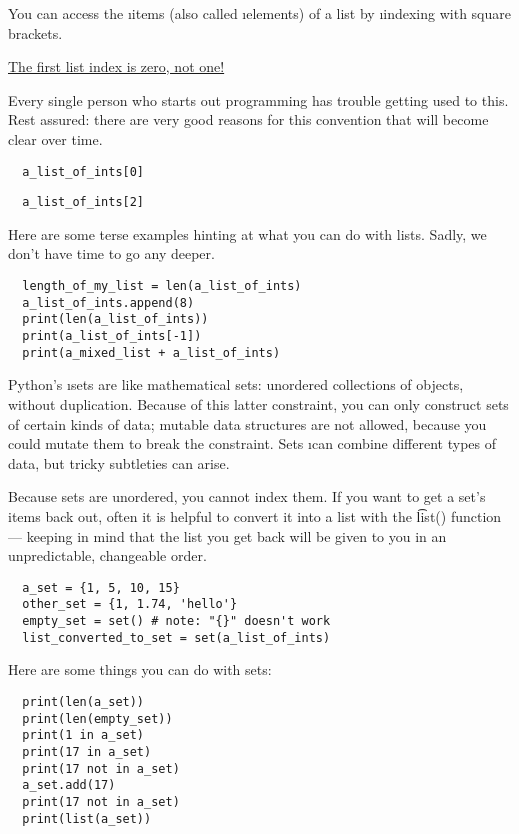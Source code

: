 \documentclass[letterpaper, 12pt, titlepage, twoside]{article}
\begin{document}
You can access the \i{items} (also called \i{elements}) of a list by
\i{indexing} with square brackets.

\medskip
\begin{center}
  \Large \underline{The first list index is zero, not one!}
\end{center}
\medskip

Every single person who starts out programming has trouble getting used to
this. Rest assured: there are very good reasons for this convention that will
become clear over time.

\begin{lstlisting}
  a_list_of_ints[0]
\end{lstlisting}

\begin{lstlisting}
  a_list_of_ints[2]
\end{lstlisting}

Here are some terse examples hinting at what you can do with lists. Sadly, we
don't have time to go any deeper.

\begin{lstlisting}
  length_of_my_list = len(a_list_of_ints)
  a_list_of_ints.append(8)
  print(len(a_list_of_ints))
  print(a_list_of_ints[-1])
  print(a_mixed_list + a_list_of_ints)
\end{lstlisting}

Python's \i{sets} are like mathematical sets: unordered collections of
objects, without duplication. Because of this latter constraint, you can only
construct sets of certain kinds of data; mutable data structures are not
allowed, because you could mutate them to break the constraint. Sets \i{can}
combine different types of data, but tricky subtleties can arise.

Because sets are unordered, you cannot index them. If you want to get a set's
items back out, often it is helpful to convert it into a list with the
\t{list()} function --- keeping in mind that the list you get back will be
given to you in an unpredictable, changeable order.

\begin{lstlisting}
  a_set = {1, 5, 10, 15}
  other_set = {1, 1.74, 'hello'}
  empty_set = set() # note: "{}" doesn't work
  list_converted_to_set = set(a_list_of_ints)
\end{lstlisting}

Here are some things you can do with sets:

\begin{lstlisting}
  print(len(a_set))
  print(len(empty_set))
  print(1 in a_set)
  print(17 in a_set)
  print(17 not in a_set)
  a_set.add(17)
  print(17 not in a_set)
  print(list(a_set))
\end{lstlisting}
\end{document}
